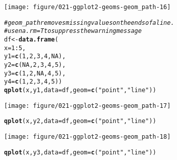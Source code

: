 \documentclass[a4paper,titlepage]{tufte-handout}\usepackage[]{graphicx}\usepackage[]{color}
\makeatletter
\def\maxwidth{ %
  \ifdim\Gin@nat@width>\linewidth
    \linewidth
  \else
    \Gin@nat@width
  \fi
}
\newcommand{\hlnum}[1]{\textcolor[rgb]{0.686,0.059,0.569}{#1}}%
\newcommand{\hlstr}[1]{\textcolor[rgb]{0.192,0.494,0.8}{#1}}%
\newcommand{\hlcom}[1]{\textcolor[rgb]{0.678,0.584,0.686}{\textit{#1}}}%
\newcommand{\hlopt}[1]{\textcolor[rgb]{0,0,0}{#1}}%
\newcommand{\hlstd}[1]{\textcolor[rgb]{0.345,0.345,0.345}{#1}}%
\newcommand{\hlkwb}[1]{\textcolor[rgb]{0.69,0.353,0.396}{#1}}%
\newcommand{\hlkwc}[1]{\textcolor[rgb]{0.333,0.667,0.333}{#1}}%
\newcommand{\hlkwd}[1]{\textcolor[rgb]{0.737,0.353,0.396}{\textbf{#1}}}%
\newenvironment{kframe}{%
 \def\at@end@of@kframe{}%
 \ifinner\ifhmode%
  \def\at@end@of@kframe{\end{minipage}}%
  \begin{minipage}{\columnwidth}%
 \fi\fi%
 \def\FrameCommand##1{\hskip\@totalleftmargin \hskip-\fboxsep
 \colorbox{shadecolor}{##1}\hskip-\fboxsep
     \hskip-\linewidth \hskip-\@totalleftmargin \hskip\columnwidth}%
 \MakeFramed {\advance\hsize-\width
   \@totalleftmargin\z@ \linewidth\hsize
   \@setminipage}}%
 {\par\unskip\endMakeFramed%
 \at@end@of@kframe}
\newenvironment{knitrout}{}{} %
\makeatother
\begin{document}
\begin{knitrout}
\begin{kframe}
\begin{alltt}
\end{alltt}
\end{kframe}
\texttt{[image: figure/021-ggplot2-geoms-geom\_path-16]} 
\begin{kframe}\begin{alltt}
\hlcom{# geom_path removes missing values on the ends of a line.}
\hlcom{# use na.rm = T to suppress the warning message}
\hlstd{df} \hlkwb{<-} \hlkwd{data.frame}\hlstd{(}
  \hlkwc{x} \hlstd{=} \hlnum{1}\hlopt{:}\hlnum{5}\hlstd{,}
  \hlkwc{y1} \hlstd{=} \hlkwd{c}\hlstd{(}\hlnum{1}\hlstd{,} \hlnum{2}\hlstd{,} \hlnum{3}\hlstd{,} \hlnum{4}\hlstd{,} \hlnum{NA}\hlstd{),}
  \hlkwc{y2} \hlstd{=} \hlkwd{c}\hlstd{(}\hlnum{NA}\hlstd{,} \hlnum{2}\hlstd{,} \hlnum{3}\hlstd{,} \hlnum{4}\hlstd{,} \hlnum{5}\hlstd{),}
  \hlkwc{y3} \hlstd{=} \hlkwd{c}\hlstd{(}\hlnum{1}\hlstd{,} \hlnum{2}\hlstd{,} \hlnum{NA}\hlstd{,} \hlnum{4}\hlstd{,} \hlnum{5}\hlstd{),}
  \hlkwc{y4} \hlstd{=} \hlkwd{c}\hlstd{(}\hlnum{1}\hlstd{,} \hlnum{2}\hlstd{,} \hlnum{3}\hlstd{,} \hlnum{4}\hlstd{,} \hlnum{5}\hlstd{))}
\hlkwd{qplot}\hlstd{(x, y1,} \hlkwc{data} \hlstd{= df,} \hlkwc{geom} \hlstd{=} \hlkwd{c}\hlstd{(}\hlstr{"point"}\hlstd{,}\hlstr{"line"}\hlstd{))}
\end{alltt}


{\ttfamily\noindent\color{warningcolor}{\#\# Warning in loop\_apply(n, do.ply): Removed 1 rows containing missing values (geom\_point).}}

{\ttfamily\noindent\color{warningcolor}{\#\# Warning in loop\_apply(n, do.ply): Removed 1 rows containing missing values (geom\_path).}}\end{kframe}
\texttt{[image: figure/021-ggplot2-geoms-geom\_path-17]} 
\begin{kframe}\begin{alltt}
\hlkwd{qplot}\hlstd{(x, y2,} \hlkwc{data} \hlstd{= df,} \hlkwc{geom} \hlstd{=} \hlkwd{c}\hlstd{(}\hlstr{"point"}\hlstd{,}\hlstr{"line"}\hlstd{))}
\end{alltt}


{\ttfamily\noindent\color{warningcolor}{\#\# Warning in loop\_apply(n, do.ply): Removed 1 rows containing missing values (geom\_point).}}

{\ttfamily\noindent\color{warningcolor}{\#\# Warning in loop\_apply(n, do.ply): Removed 1 rows containing missing values (geom\_path).}}\end{kframe}
\texttt{[image: figure/021-ggplot2-geoms-geom\_path-18]} 
\begin{kframe}\begin{alltt}
\hlkwd{qplot}\hlstd{(x, y3,} \hlkwc{data} \hlstd{= df,} \hlkwc{geom} \hlstd{=} \hlkwd{c}\hlstd{(}\hlstr{"point"}\hlstd{,}\hlstr{"line"}\hlstd{))}
\end{alltt}



\end{kframe}
\end{knitrout}
\end{document}
